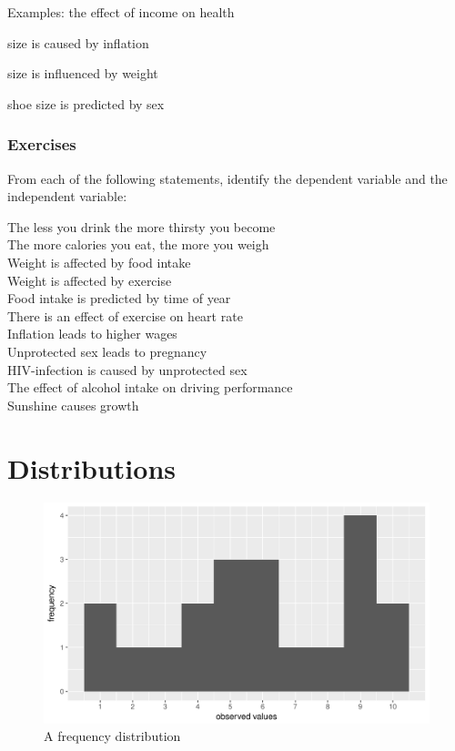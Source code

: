 \documentclass[]{report}\usepackage[]{graphicx}\usepackage[]{color}
\makeatletter
\def\maxwidth{ %
  \ifdim\Gin@nat@width>\linewidth
    \linewidth
  \else
    \Gin@nat@width
  \fi
}
\newenvironment{knitrout}{}{} %
\makeatother
\begin{document}
Examples: the effect of income on health

size is caused by inflation

size is influenced by weight

shoe size is predicted by sex


\subsubsection{Exercises} 


From each of the following statements, identify the dependent variable and the independent variable:

The less you drink the more thirsty you become \\
The more calories you eat, the more you weigh\\
Weight is affected by food intake \\
Weight is affected by exercise \\
Food intake is predicted by time of year \\
There is an effect of exercise on heart rate \\
Inflation leads to higher wages \\
Unprotected sex leads to pregnancy \\
HIV-infection is caused by unprotected sex\\
The effect of alcohol intake on driving performance\\
Sunshine causes growth

\section{Distributions}


\begin{knitrout}
\color{fgcolor}\begin{figure}

{\centering \includegraphics[width=\maxwidth]{figure/distr_1-1} 

}

\caption[A frequency distribution]{A frequency distribution}\label{fig:distr_1}
\end{figure}


\end{knitrout}
\end{document}
